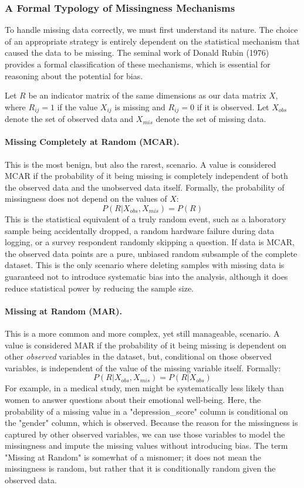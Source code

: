 \subsubsection{A Formal Typology of Missingness Mechanisms}
To handle missing data correctly, we must first understand its nature. The choice of an appropriate strategy is entirely dependent on the statistical mechanism that caused the data to be missing. The seminal work of Donald Rubin (1976) provides a formal classification of these mechanisms, which is essential for reasoning about the potential for bias.

Let $R$ be an indicator matrix of the same dimensions as our data matrix $X$, where $R_{ij}=1$ if the value $X_{ij}$ is missing and $R_{ij}=0$ if it is observed. Let $X_{obs}$ denote the set of observed data and $X_{mis}$ denote the set of missing data.

\paragraph{Missing Completely at Random (MCAR).} This is the most benign, but also the rarest, scenario. A value is considered MCAR if the probability of it being missing is completely independent of both the observed data and the unobserved data itself. Formally, the probability of missingness does not depend on the values of $X$:
$$ P(R | X_{obs}, X_{mis}) = P(R) $$
This is the statistical equivalent of a truly random event, such as a laboratory sample being accidentally dropped, a random hardware failure during data logging, or a survey respondent randomly skipping a question. If data is MCAR, the observed data points are a pure, unbiased random subsample of the complete dataset. This is the only scenario where deleting samples with missing data is guaranteed not to introduce systematic bias into the analysis, although it does reduce statistical power by reducing the sample size.

\paragraph{Missing at Random (MAR).} This is a more common and more complex, yet still manageable, scenario. A value is considered MAR if the probability of it being missing is dependent on other \textit{observed} variables in the dataset, but, conditional on those observed variables, is independent of the value of the missing variable itself. Formally:
$$ P(R | X_{obs}, X_{mis}) = P(R | X_{obs}) $$
For example, in a medical study, men might be systematically less likely than women to answer questions about their emotional well-being. Here, the probability of a missing value in a "depression\_score" column is conditional on the "gender" column, which is observed. Because the reason for the missingness is captured by other observed variables, we can use those variables to model the missingness and impute the missing values without introducing bias. The term "Missing at Random" is somewhat of a misnomer; it does not mean the missingness is random, but rather that it is conditionally random given the observed data.


